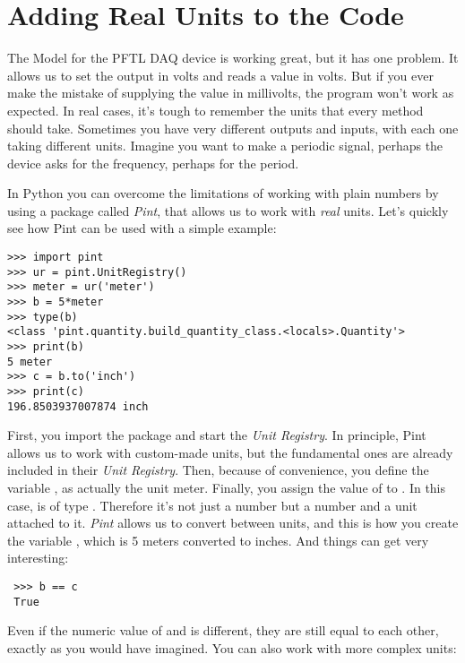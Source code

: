
\section{Adding Real Units to the Code}\label{sec:pint}
The Model for the {PFTL DAQ} device is working great, but it has one problem. It allows us to set the output in volts and reads a value in volts. But if you ever make the mistake of supplying the value in millivolts, the program won't work as expected. In real cases, it's tough to remember the units that every method should take. Sometimes you have very different outputs and inputs, with each one taking different units. Imagine you want to make a periodic signal, perhaps the device asks for the frequency, perhaps for the period.

In Python you can overcome the limitations of working with plain numbers by using a package called \emph{Pint}, that allows us to work with \emph{real} units. Let's quickly see how Pint can be used with a simple example:

\begin{verbatim}
>>> import pint
>>> ur = pint.UnitRegistry()
>>> meter = ur('meter')
>>> b = 5*meter
>>> type(b)
<class 'pint.quantity.build_quantity_class.<locals>.Quantity'>
>>> print(b)
5 meter
>>> c = b.to('inch')
>>> print(c)
196.8503937007874 inch
\end{verbatim}

First, you import the package and start the \emph{Unit Registry}. In principle, Pint allows us to work with custom-made units, but the fundamental ones are already included in their \emph{Unit Registry}. Then, because of convenience, you define the variable , as actually the unit meter. Finally, you assign the value of  to . In this case,  is of type . Therefore it's not just a number but a number and a unit attached to it. \emph{Pint} allows us to convert between units, and this is how you create the variable , which is 5 meters converted to inches. And things can get very interesting:

\begin{verbatim}
 >>> b == c
 True
\end{verbatim}

Even if the numeric value of  and  is different, they are still equal to each other, exactly as you would have imagined. You can also work with more complex units:


